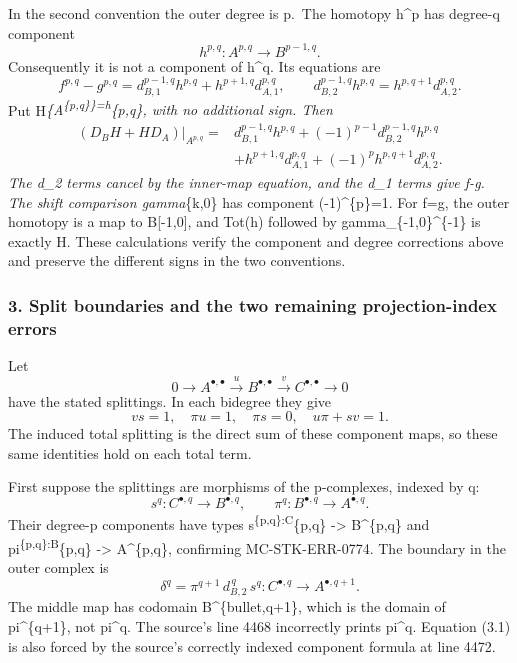 In the second convention the outer degree is p.~The homotopy h\^{}p has degree-q component \[
h^{p,q}:A^{p,q}\longrightarrow B^{p-1,q}.
\] Consequently it is not a component of h\^{}q. Its equations are \[
f^{p,q}-g^{p,q}
=d_{B,1}^{p-1,q}h^{p,q}+h^{p+1,q}d_{A,1}^{p,q},
\qquad
d_{B,2}^{p-1,q}h^{p,q}=h^{p,q+1}d_{A,2}^{p,q}.
\] Put H\textbar{}\emph{\{A\textsuperscript{\{p,q\}\}=h}\{p,q\}, with no additional sign. Then \[
\begin{aligned}
(D_BH+HD_A)|_{A^{p,q}}
={}&d_{B,1}^{p-1,q}h^{p,q}
 +(-1)^{p-1}d_{B,2}^{p-1,q}h^{p,q}\\
 &+h^{p+1,q}d_{A,1}^{p,q}
 +(-1)^p h^{p,q+1}d_{A,2}^{p,q}.
\end{aligned}
\] The d\_2 terms cancel by the inner-map equation, and the d\_1 terms give f-g. The shift comparison gamma}\{k,0\} has component (-1)\^{}\{p\}=1. For f=g, the outer homotopy is a map to B{[}-1,0{]}, and Tot(h) followed by gamma\_\{-1,0\}\^{}\{-1\} is exactly H. These calculations verify the component and degree corrections above and preserve the different signs in the two conventions.

\subsubsection{3. Split boundaries and the two remaining projection-index errors}\label{split-boundaries-and-the-two-remaining-projection-index-errors}

Let \[
0\longrightarrow A^{\bullet,\bullet}
\xrightarrow{u}B^{\bullet,\bullet}
\xrightarrow{v}C^{\bullet,\bullet}\longrightarrow0
\] have the stated splittings. In each bidegree they give \[
v s=1,\quad \pi u=1,\quad \pi s=0,\quad u\pi+s v=1.
\] The induced total splitting is the direct sum of these component maps, so these same identities hold on each total term.

First suppose the splittings are morphisms of the p-complexes, indexed by q: \[
s^q:C^{\bullet,q}\longrightarrow B^{\bullet,q},\qquad
\pi^q:B^{\bullet,q}\longrightarrow A^{\bullet,q}.
\] Their degree-p components have types s\textsuperscript{\{p,q\}:C}\{p,q\} -\textgreater{} B\^{}\{p,q\} and pi\textsuperscript{\{p,q\}:B}\{p,q\} -\textgreater{} A\^{}\{p,q\}, confirming MC-STK-ERR-0774. The boundary in the outer complex is \[
\boxed{\quad
\delta^q=\pi^{q+1}\,d_{B,2}^{\,q}\,s^q:
C^{\bullet,q}\longrightarrow A^{\bullet,q+1}.
\quad}                                                     \tag{3.1}
\] The middle map has codomain B\^{}\{bullet,q+1\}, which is the domain of pi\^{}\{q+1\}, not pi\^{}q. The source's line 4468 incorrectly prints pi\^{}q. Equation (3.1) is also forced by the source's correctly indexed component formula at line 4472.

